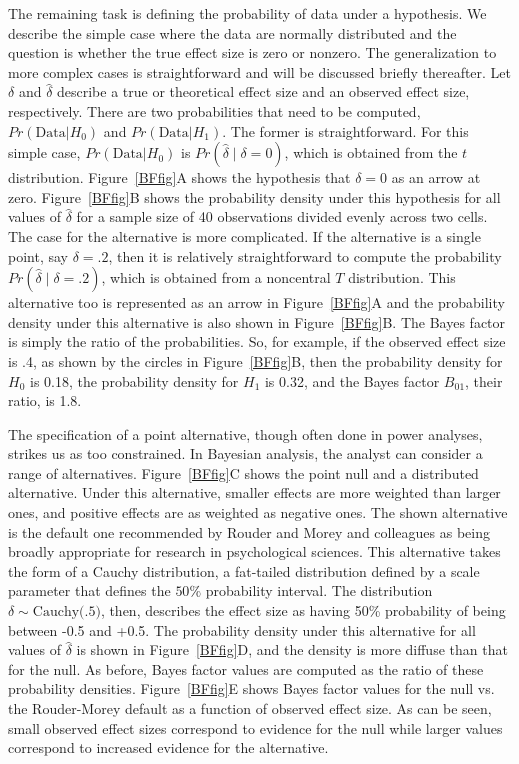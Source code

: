 \documentclass[man]{apa6}
\begin{document}
The remaining task is defining the probability of data under a hypothesis.  We describe the simple case where the data are normally distributed and the question is whether the true effect size is zero or nonzero.  The generalization to more complex cases is straightforward and will be discussed briefly thereafter.  Let $\delta$ and $\hat{\delta}$ describe a true or theoretical effect size and an observed effect size, respectively.  There are two probabilities that need to be computed,   $Pr(\mbox{Data} | H_0)$ and $Pr(\mbox{Data} | H_1)$.   The former is straightforward.  For this simple case, $Pr(\mbox{Data} | H_0)$ is $Pr(\hat{\delta} \mid \delta=0)$, which is obtained from the $t$ distribution.  Figure~\ref{BFfig}A shows the hypothesis that $\delta=0$ as an arrow at zero.  Figure~\ref{BFfig}B shows the probability density under this hypothesis for all values of $\hat{\delta}$ for a sample size of 40 observations divided evenly across two cells. The case for the alternative is more complicated.  If the alternative is a single point, say $\delta=.2$, then it is relatively straightforward to compute the probability $Pr(\hat{\delta} \mid \delta=.2)$, which is obtained from a noncentral $T$ distribution.   This alternative too is represented as an arrow in Figure~\ref{BFfig}A and the probability density under this alternative is also shown in Figure~\ref{BFfig}B. The Bayes factor is simply the ratio of the probabilities.  So, for example, if the observed effect size is .4, as shown by the circles in Figure~\ref{BFfig}B, then the probability density for $H_0$ is 0.18, the probability density for $H_1$ is 0.32, and the Bayes factor $B_{01}$, their ratio, is 1.8. 

The specification of a point alternative, though often done in power analyses, strikes us as too constrained.  In Bayesian analysis, the analyst can consider a range of alternatives.  Figure~\ref{BFfig}C shows the point null and a distributed alternative.  Under this alternative, smaller effects are more weighted than larger ones, and positive effects are as weighted as negative ones.  The shown alternative is the default one recommended by Rouder and Morey and colleagues \citep{Rouder:etal:2009a,Morey:Rouder:2011,Rouder:Morey:2012,Rouder:etal:2012} as being broadly appropriate for research in psychological sciences. This alternative takes the form of a Cauchy distribution, a fat-tailed distribution defined by a scale parameter that defines the $50\%$ probability interval. The distribution $\delta \sim \mbox{Cauchy(.5)}$, then, describes the effect size as having 50\% probability of being between -0.5 and +0.5. The probability density under this alternative for all values of $\hat{\delta}$ is shown in Figure~\ref{BFfig}D, and the density is more diffuse than that for the null.   As before, Bayes factor values are computed as the ratio of these probability densities.   Figure~\ref{BFfig}E shows Bayes factor values for the null vs. the Rouder-Morey default as a function of observed effect size. As can be seen, small observed effect sizes correspond to evidence for the null while larger values correspond to increased evidence for the alternative.  
\end{document}
